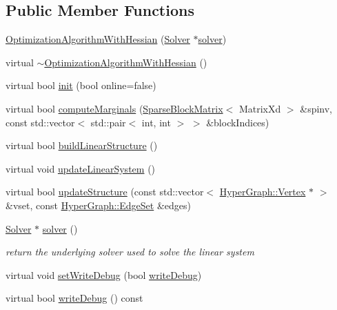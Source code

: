 \subsection*{Public Member Functions}
\begin{DoxyCompactItemize}
\item 
\hyperlink{classg2o_1_1OptimizationAlgorithmWithHessian_a1358f3500efe8b95a5af4a1b0edecdf0}{Optimization\+Algorithm\+With\+Hessian} (\hyperlink{classg2o_1_1Solver}{Solver} $\ast$\hyperlink{classg2o_1_1OptimizationAlgorithmWithHessian_a85473a4073c76b1a52cf9cf175e31c45}{solver})
\item 
virtual \hyperlink{classg2o_1_1OptimizationAlgorithmWithHessian_a9cfed4c23f1b09829cf4857cf2213745}{$\sim$\+Optimization\+Algorithm\+With\+Hessian} ()
\item 
virtual bool \hyperlink{classg2o_1_1OptimizationAlgorithmWithHessian_ae067a9c2961718dc8a37e3b8478b6d01}{init} (bool online=false)
\item 
virtual bool \hyperlink{classg2o_1_1OptimizationAlgorithmWithHessian_af1959727df2b7cf233a171cfed246e9a}{compute\+Marginals} (\hyperlink{classg2o_1_1SparseBlockMatrix}{Sparse\+Block\+Matrix}$<$ Matrix\+Xd $>$ \&spinv, const std\+::vector$<$ std\+::pair$<$ int, int $>$ $>$ \&block\+Indices)
\item 
virtual bool \hyperlink{classg2o_1_1OptimizationAlgorithmWithHessian_aa84732c8554039ba0152693837bd1b4a}{build\+Linear\+Structure} ()
\item 
virtual void \hyperlink{classg2o_1_1OptimizationAlgorithmWithHessian_a3ceacb3dddb14121b03e0afe7b7cfeaa}{update\+Linear\+System} ()
\item 
virtual bool \hyperlink{classg2o_1_1OptimizationAlgorithmWithHessian_a9ffffb2bdb70db856bccdb6774776fa3}{update\+Structure} (const std\+::vector$<$ \hyperlink{classg2o_1_1HyperGraph_1_1Vertex}{Hyper\+Graph\+::\+Vertex} $\ast$ $>$ \&vset, const \hyperlink{classg2o_1_1HyperGraph_a5e2970e236c0dcb4eff7c205d7b6b4ae}{Hyper\+Graph\+::\+Edge\+Set} \&edges)
\item 
\hyperlink{classg2o_1_1Solver}{Solver} $\ast$ \hyperlink{classg2o_1_1OptimizationAlgorithmWithHessian_a85473a4073c76b1a52cf9cf175e31c45}{solver} ()
\begin{DoxyCompactList}\small\item\em return the underlying solver used to solve the linear system \end{DoxyCompactList}\item 
virtual void \hyperlink{classg2o_1_1OptimizationAlgorithmWithHessian_a655aee24aae72b55f5edafb0a7a15137}{set\+Write\+Debug} (bool \hyperlink{classg2o_1_1OptimizationAlgorithmWithHessian_ac3f458237efd3b000de0032f97bca0b7}{write\+Debug})
\item 
virtual bool \hyperlink{classg2o_1_1OptimizationAlgorithmWithHessian_ac3f458237efd3b000de0032f97bca0b7}{write\+Debug} () const 
\end{DoxyCompactItemize}
